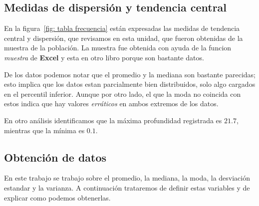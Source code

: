 \documentclass[12pt]{article}
\begin{document}
	

\subsection{Medidas de dispersión y tendencia central}

	\par En la figura~\ref{fig: tabla frecuencia} están expresadas las medidas de tendencia central y dispersión, que revisamos en esta unidad, que fueron obtenidas de la muestra de la población. La muestra fue obtenida con ayuda de la funcion \textit{muestra} de \textbf{Excel} y esta en otro libro porque son bastante datos.
	\par De los datos podemos notar que el promedio y la mediana son bastante parecidas; esto implica que los datos estan parcialmente bien distribuidos, solo algo cargados en el percentil inferior. Aunque por otro lado, el que la moda no coincida con estos indica que hay valores \textit{erráticos} en ambos extremos de los datos.
	\par En otro análisis identificamos que la máxima profundidad registrada es $21.7$, mientras que la mínima es $0.1$.
	


\subsection*{Obtención de datos}

	\par En este trabajo se trabajo sobre el promedio, la mediana, la moda, la desviación estandar y la varianza. A continuación trataremos de definir estas variables y de explicar como podemos obtenerlas.
	
\end{document}
